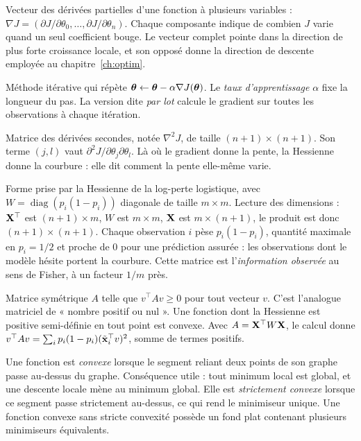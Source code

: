 \begin{description}[style=nextline,leftmargin=0pt]
  \item[\dsym{gradient}{Gradient}]
  Vecteur des dérivées partielles d'une fonction à plusieurs variables :
  $\nabla J=(\partial J/\partial\theta_0,\ldots,\partial J/\partial\theta_n)$.
  Chaque composante indique de combien $J$ varie quand un seul coefficient bouge.
  Le vecteur complet pointe dans la direction de plus forte croissance locale, et
  son opposé donne la direction de descente employée au chapitre~\ref{ch:optim}.

  \item[\dsym{descente}{Descente de gradient}]
  Méthode itérative qui répète $\boldsymbol{\theta}\leftarrow\boldsymbol{\theta}-\alpha\nabla J(\boldsymbol{\theta})$. Le
  \emph{taux d'apprentissage} $\alpha$ fixe la longueur du pas. La version dite
  \emph{par lot} calcule le gradient sur toutes les observations à chaque
  itération.

  \item[\dsym{hessienne}{Hessienne}]
  Matrice des dérivées secondes, notée $\nabla^2J$, de taille
  $(n+1)\times(n+1)$. Son terme $(j,l)$ vaut
  $\partial^2 J/\partial\theta_j\partial\theta_l$. Là où le gradient donne la
  pente, la Hessienne donne la courbure : elle dit comment la pente elle-même
  varie.

  \item[\dsym{xtwx}{L'expression $\X^\top W\X$}]
  Forme prise par la Hessienne de la log-perte logistique, avec
  $W=\operatorname{diag}(p_i(1-p_i))$ diagonale de taille $m\times m$. Lecture
  des dimensions : $\mathbf{X}^\top$ est $(n+1)\times m$, $W$ est $m\times m$, $\mathbf{X}$ est
  $m\times(n+1)$, le produit est donc $(n+1)\times(n+1)$. Chaque observation $i$
  pèse $p_i(1-p_i)$, quantité maximale en $p_i=1/2$ et proche de $0$ pour une
  prédiction assurée : les observations dont le modèle hésite portent la
  courbure. Cette matrice est l'\emph{information observée} au sens de Fisher, à
  un facteur $1/m$ près.

  \item[\dsym{psd}{Matrice positive semi-définie}]
  Matrice symétrique $A$ telle que $v^\top Av\geq0$ pour tout vecteur $v$. C'est
  l'analogue matriciel de « nombre positif ou nul ». Une fonction dont la
  Hessienne est positive semi-définie en tout point est convexe. Avec
  $A=\mathbf{X}^\top W\mathbf{X}$, le calcul donne
  $v^\top Av=\sum_i p_i(1-p_i)(\tilde{\mathbf{x}}_i^\top v)^2$, somme de termes positifs.

  \item[\dsym{convexite}{Convexité et stricte convexité}]
  Une fonction est \emph{convexe} lorsque le segment reliant deux points de son
  graphe passe au-dessus du graphe. Conséquence utile : tout minimum local est
  global, et une descente locale mène au minimum global. Elle est
  \emph{strictement convexe} lorsque ce segment passe strictement au-dessus, ce
  qui rend le minimiseur unique. Une fonction convexe sans stricte convexité
  possède un fond plat contenant plusieurs minimiseurs équivalents.


\end{description}

